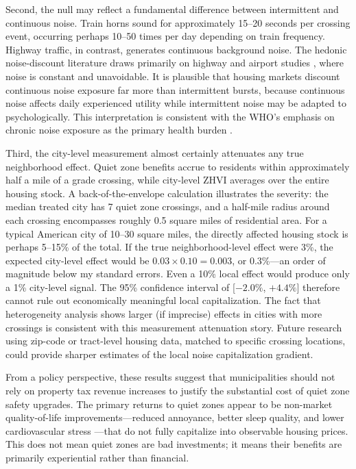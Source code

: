 \documentclass[12pt]{article}
\begin{document}
Second, the null may reflect a fundamental difference between intermittent and continuous noise. Train horns sound for approximately 15--20 seconds per crossing event, occurring perhaps 10--50 times per day depending on train frequency. Highway traffic, in contrast, generates continuous background noise. The hedonic noise-discount literature draws primarily on highway and airport studies \citep{nelson1982airports, navrud2002economic, boes2013hedonic}, where noise is constant and unavoidable. It is plausible that housing markets discount continuous noise exposure far more than intermittent bursts, because continuous noise affects daily experienced utility while intermittent noise may be adapted to psychologically. This interpretation is consistent with the WHO's emphasis on chronic noise exposure as the primary health burden \citep{who2011burden}.

Third, the city-level measurement almost certainly attenuates any true neighborhood effect. Quiet zone benefits accrue to residents within approximately half a mile of a grade crossing, while city-level ZHVI averages over the entire housing stock. A back-of-the-envelope calculation illustrates the severity: the median treated city has 7 quiet zone crossings, and a half-mile radius around each crossing encompasses roughly 0.5 square miles of residential area. For a typical American city of 10--30 square miles, the directly affected housing stock is perhaps 5--15\% of the total. If the true neighborhood-level effect were 3\%, the expected city-level effect would be $0.03 \times 0.10 = 0.003$, or 0.3\%---an order of magnitude below my standard errors. Even a 10\% local effect would produce only a 1\% city-level signal. The 95\% confidence interval of [$-2.0\%$, $+4.4\%$] therefore cannot rule out economically meaningful local capitalization. The fact that heterogeneity analysis shows larger (if imprecise) effects in cities with more crossings is consistent with this measurement attenuation story. Future research using zip-code or tract-level housing data, matched to specific crossing locations, could provide sharper estimates of the local noise capitalization gradient.

From a policy perspective, these results suggest that municipalities should not rely on property tax revenue increases to justify the substantial cost of quiet zone safety upgrades. The primary returns to quiet zones appear to be non-market quality-of-life improvements---reduced annoyance, better sleep quality, and lower cardiovascular stress \citep{who2011burden}---that do not fully capitalize into observable housing prices. This does not mean quiet zones are bad investments; it means their benefits are primarily experiential rather than financial.
\end{document}
